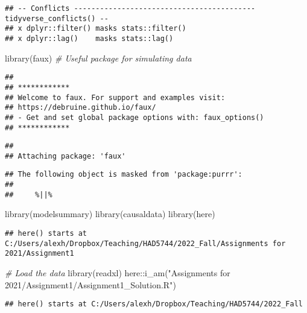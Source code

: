 \documentclass[
]{article}
\newenvironment{Shaded}{\begin{snugshade}}{\end{snugshade}}
\newcommand{\CommentTok}[1]{\textcolor[rgb]{0.56,0.35,0.01}{\textit{#1}}}
\newcommand{\FunctionTok}[1]{\textcolor[rgb]{0.00,0.00,0.00}{#1}}
\newcommand{\NormalTok}[1]{#1}
\newcommand{\SpecialCharTok}[1]{\textcolor[rgb]{0.00,0.00,0.00}{#1}}
\newcommand{\StringTok}[1]{\textcolor[rgb]{0.31,0.60,0.02}{#1}}
\begin{document}
\begin{verbatim}
## -- Conflicts ------------------------------------------ tidyverse_conflicts() --
## x dplyr::filter() masks stats::filter()
## x dplyr::lag()    masks stats::lag()
\end{verbatim}

\begin{Shaded}
\begin{Highlighting}[]
\FunctionTok{library}\NormalTok{(faux) }\CommentTok{\# Useful package for simulating data}
\end{Highlighting}
\end{Shaded}

\begin{verbatim}
## 
## ************
## Welcome to faux. For support and examples visit:
## https://debruine.github.io/faux/
## - Get and set global package options with: faux_options()
## ************
\end{verbatim}

\begin{verbatim}
## 
## Attaching package: 'faux'
\end{verbatim}

\begin{verbatim}
## The following object is masked from 'package:purrr':
## 
##     %||%
\end{verbatim}

\begin{Shaded}
\begin{Highlighting}[]
\FunctionTok{library}\NormalTok{(modelsummary) }
\FunctionTok{library}\NormalTok{(causaldata)}
\FunctionTok{library}\NormalTok{(here)}
\end{Highlighting}
\end{Shaded}

\begin{verbatim}
## here() starts at C:/Users/alexh/Dropbox/Teaching/HAD5744/2022_Fall/Assignments for 2021/Assignment1
\end{verbatim}

\begin{Shaded}
\begin{Highlighting}[]
\CommentTok{\# Load the data}
\FunctionTok{library}\NormalTok{(readxl)}
\NormalTok{here}\SpecialCharTok{::}\FunctionTok{i\_am}\NormalTok{(}\StringTok{"Assignments for 2021/Assignment1/Assignment1\_Solution.R"}\NormalTok{)}
\end{Highlighting}
\end{Shaded}

\begin{verbatim}
## here() starts at C:/Users/alexh/Dropbox/Teaching/HAD5744/2022_Fall
\end{verbatim}
\end{document}
